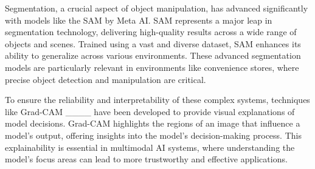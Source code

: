 Segmentation, a crucial aspect of object manipulation, has advanced significantly with models like the SAM by Meta AI. SAM represents a major leap in segmentation technology, delivering high-quality results across a wide range of objects and scenes. Trained using a vast and diverse dataset, SAM enhances its ability to generalize across various environments. These advanced segmentation models are particularly relevant in environments like convenience stores, where precise object detection and manipulation are critical.

To ensure the reliability and interpretability of these complex systems, techniques like Grad-CAM ____ have been developed to provide visual explanations of model decisions. Grad-CAM highlights the regions of an image that influence a model’s output, offering insights into the model’s decision-making process. This explainability is essential in multimodal AI systems, where understanding the model’s focus areas can lead to more trustworthy and effective applications.
